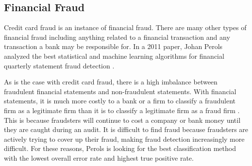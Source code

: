 \documentclass[midd]{thesis}
\begin{document}


\subsection{Financial Fraud}

Credit card fraud is an instance of financial fraud. There are many other types of financial fraud including anything related to a financial transaction and any transaction a bank may be responsible for. In a 2011 paper, Johan Perols analyzed the best statistical and machine learning algorithms for financial quarterly statement fraud detection \cite{Perols2011}.  

As is the case with credit card fraud, there is a high imbalance between fraudulent financial statements and non-fraudulent statements. With financial statements, it is much more costly to a bank or a firm to classify a fraudulent firm as a legitimate firm than it is to classify a legitimate firm as a fraud firm \cite{Perols2011}. This is because fraudsters will continue to cost a company or bank money until they are caught during an audit. It is difficult to find fraud because fraudsters are actively trying to cover up their fraud, making fraud detection increasingly more difficult. For these reasons, Perols is looking for the best classification method with the lowest overall error rate and highest true positive rate. 
\end{document}
